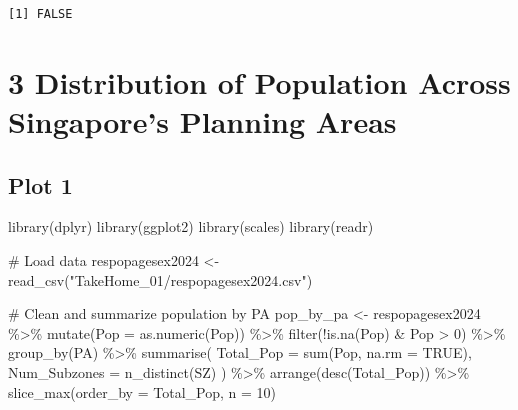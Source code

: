 \documentclass[
  letterpaper,
  DIV=11,
  numbers=noendperiod]{scrartcl}
\newenvironment{Shaded}{\begin{snugshade}}{\end{snugshade}}
\newcommand{\AttributeTok}[1]{\textcolor[rgb]{0.40,0.45,0.13}{#1}}
\newcommand{\CommentTok}[1]{\textcolor[rgb]{0.37,0.37,0.37}{#1}}
\newcommand{\ConstantTok}[1]{\textcolor[rgb]{0.56,0.35,0.01}{#1}}
\newcommand{\DecValTok}[1]{\textcolor[rgb]{0.68,0.00,0.00}{#1}}
\newcommand{\FunctionTok}[1]{\textcolor[rgb]{0.28,0.35,0.67}{#1}}
\newcommand{\NormalTok}[1]{\textcolor[rgb]{0.00,0.23,0.31}{#1}}
\newcommand{\OtherTok}[1]{\textcolor[rgb]{0.00,0.23,0.31}{#1}}
\newcommand{\SpecialCharTok}[1]{\textcolor[rgb]{0.37,0.37,0.37}{#1}}
\newcommand{\StringTok}[1]{\textcolor[rgb]{0.13,0.47,0.30}{#1}}
\begin{document}
\begin{verbatim}
[1] FALSE
\end{verbatim}

\section{3 Distribution of Population Across Singapore's Planning
Areas}\label{distribution-of-population-across-singapores-planning-areas}

\subsection{Plot 1}\label{plot-1}

\begin{Shaded}
\begin{Highlighting}[]
\FunctionTok{library}\NormalTok{(dplyr)}
\FunctionTok{library}\NormalTok{(ggplot2)}
\FunctionTok{library}\NormalTok{(scales)}
\FunctionTok{library}\NormalTok{(readr)}

\CommentTok{\# Load data}
\NormalTok{respopagesex2024 }\OtherTok{\textless{}{-}} \FunctionTok{read\_csv}\NormalTok{(}\StringTok{"TakeHome\_01/respopagesex2024.csv"}\NormalTok{)}

\CommentTok{\# Clean and summarize population by PA}
\NormalTok{pop\_by\_pa }\OtherTok{\textless{}{-}}\NormalTok{ respopagesex2024 }\SpecialCharTok{\%\textgreater{}\%}
  \FunctionTok{mutate}\NormalTok{(}\AttributeTok{Pop =} \FunctionTok{as.numeric}\NormalTok{(Pop)) }\SpecialCharTok{\%\textgreater{}\%}
  \FunctionTok{filter}\NormalTok{(}\SpecialCharTok{!}\FunctionTok{is.na}\NormalTok{(Pop) }\SpecialCharTok{\&}\NormalTok{ Pop }\SpecialCharTok{\textgreater{}} \DecValTok{0}\NormalTok{) }\SpecialCharTok{\%\textgreater{}\%}
  \FunctionTok{group\_by}\NormalTok{(PA) }\SpecialCharTok{\%\textgreater{}\%}
  \FunctionTok{summarise}\NormalTok{(}
    \AttributeTok{Total\_Pop =} \FunctionTok{sum}\NormalTok{(Pop, }\AttributeTok{na.rm =} \ConstantTok{TRUE}\NormalTok{),}
    \AttributeTok{Num\_Subzones =} \FunctionTok{n\_distinct}\NormalTok{(SZ)}
\NormalTok{  ) }\SpecialCharTok{\%\textgreater{}\%}
  \FunctionTok{arrange}\NormalTok{(}\FunctionTok{desc}\NormalTok{(Total\_Pop)) }\SpecialCharTok{\%\textgreater{}\%}
  \FunctionTok{slice\_max}\NormalTok{(}\AttributeTok{order\_by =}\NormalTok{ Total\_Pop, }\AttributeTok{n =} \DecValTok{10}\NormalTok{) }


\end{Highlighting}
\end{Shaded}
\end{document}
